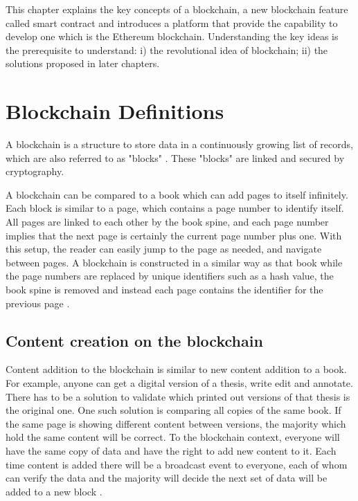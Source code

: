 \documentclass[twoside,draftfooter]{tutthesis} %
\begin{document}
This chapter explains the key concepts of a blockchain, a new blockchain feature called smart contract and introduces a platform that provide the capability to develop one which is the Ethereum blockchain. Understanding the key ideas is the prerequisite to understand: i) the revolutional idea of blockchain; ii) the solutions proposed in later chapters.

\section{Blockchain Definitions}

A blockchain is a structure to store data in a continuously growing list of records, which are also referred to as "blocks" \citep{RefWorks:doc:WhatIsBlockChain}. These "blocks" are linked and secured by cryptography.

A blockchain can be compared to a book which can add pages to itself infinitely. Each block is similar to a page, which contains a page number to identify itself. All pages are linked to each other by the book spine, and each page number implies that the next page is certainly the current page number plus one. With this setup, the reader can easily jump to the page as needed, and navigate between pages. A blockchain is constructed in a similar way as that book while the page numbers are replaced by unique identifiers such as a hash value, the book spine is removed and instead each page contains the identifier for the previous page \citep{RefWorks:doc:BlockchainBasicsBook}.

\subsection{Content creation on the blockchain}
\label{contentCreationOnBlockchain}

Content addition to the blockchain is similar to new content addition to a book. For example, anyone can get a digital version of a thesis, write edit and annotate. There has to be a solution to validate which printed out versions of that thesis is the original one. One such solution is comparing all copies of the same book. If the same page is showing different content between versions, the majority which hold the same content will be correct. To the blockchain context, everyone will have the same copy of data and have the right to add new content to it. Each time content is added there will be a broadcast event to everyone, each of whom can verify the data and the majority will decide the next set of data will be added to a new block \citep{RefWorks:doc:BitcoinWhitepaper}.
\end{document}
